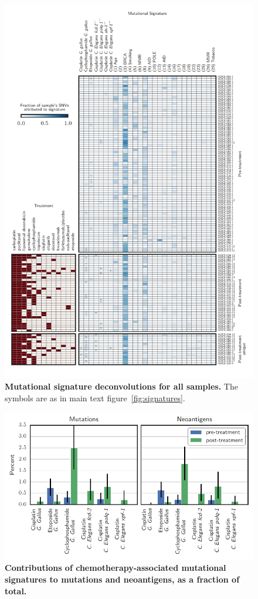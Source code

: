 \begin{figure}
\centering
\includegraphics[scale=1.0]{figures/supplementary_signatures.pdf}
\caption{\textbf{Mutational signature deconvolutions for all samples.} The symbols are as in main text figure~\ref{fig:signatures}.}
\label{fig:supp_signatures}
\end{figure}

\begin{figure}
\centering
\includegraphics[scale=1.0]{figures/sources_of_mutations_and_neoantigens_ungrouped.pdf}
\caption{\textbf{Contributions of chemotherapy-associated mutational signatures to mutations and neoantigens, as a fraction of total.}}
\label{fig:supp_sources}
\end{figure}

